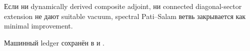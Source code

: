 Если ни dynamically derived composite adjoint, ни connected diagonal-sector
extension не дают suitable vacuum, spectral Pati--Salam ветвь закрывается
как minimal improvement.

Машинный ledger сохранён в
 и
.